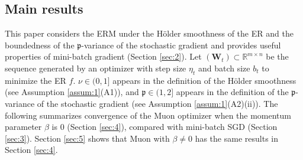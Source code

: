 \documentclass[twoside,11pt]{article}
\begin{document}
\subsection{Main results}
This paper considers the ERM under the H\"{o}lder smoothness of the ER and the boundedness of the $\mathfrak{p}$-variance of the stochastic gradient and provides useful properties of mini-batch gradient (Section \ref{sec:2}). Let $(\bm{W}_t) \subset \mathbb{R}^{m \times n}$ be the sequence generated by an optimizer with step size $\eta_t$ and batch size $b_t$ to minimize the ER $f$. $\nu \in (0,1]$ appears in the definition of the H\"{o}lder smoothness (see Assumption \ref{assum:1}(A1)), and $\mathfrak{p} \in (1,2]$ appears in the definition of the $\mathfrak{p}$-variance of the stochastic gradient (see Assumption \ref{assum:1}(A2)(ii)). The following summarizes convergence of the Muon optimizer when the momentum parameter $\beta$ is $0$ (Section \ref{sec:4}), compared with mini-batch SGD (Section \ref{sec:3}). Section \ref{sec:5} shows that Muon with $\beta \neq 0$ has the same results in Section \ref{sec:4}. 
\end{document}
